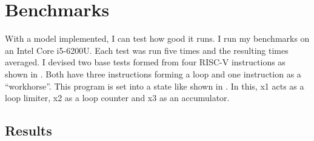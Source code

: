 \chapter{Benchmarks}\label{chap:benchmarks}
With a model implemented, I can test how good it runs. I run my
benchmarks on an Intel Core i5-6200U. Each test was run five times
and the resulting times averaged. I devised two base tests formed
from four RISC-V instructions as shown in
. Both have three instructions forming a
loop and one instruction as a \enquote{workhorse}. This program is
set into a state like shown in . In this,
x1 acts as a loop limiter, x2 as a loop counter and x3 as an
accumulator.




\section{Results}

